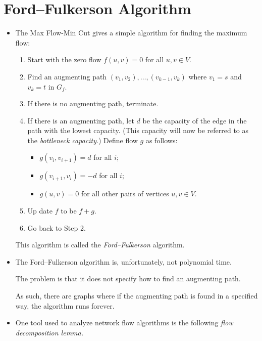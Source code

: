 \documentclass[10pt]{article}
\begin{document}
  \section{Ford--Fulkerson Algorithm} %
  \label{sec:ford-fulkerson}
    \begin{itemize}
      \item The Max Flow-Min Cut gives a simple algorithm for
        finding the maximum flow:
        \begin{enumerate}
          \item Start with the zero flow $f(u,v) = 0$ for all $u, v \in V$.
          \item Find an augmenting path $(v_1, v_2), \dotsc, (v_{k-1}, v_k)$
            where $v_1 = s$ and $v_k = t$ in $G_f$.
          \item If there is no augmenting path, terminate.
          \item If there is an augmenting path, let $d$ be the capacity
             of the edge in the path with the lowest capacity.
             (This capacity will now be referred to as the \emph{bottleneck capacity}.)
             Define flow $g$ as follows:
             \begin{itemize}
              \item $g(v_i, v_{i+1}) = d$ for all $i$;
              \item $g(v_{i+1}, v_i) = -d$ for all $i$;
              \item $g(u,v) = 0$ for all other pairs of vertices $u, v \in V.$
             \end{itemize}
          \item Up date $f$ to be $f + g$.
          \item Go back to Step 2.
        \end{enumerate}
        This algorithm is called the \emph{Ford--Fulkerson} algorithm.
        
      \item The Ford--Fulkerson algorithm is, unfortunately, not polynomial time.
        
        The problem is that it does not specify how to find an augmenting path.
        
        As such, there are graphs where if the augmenting path is found in
        a specified way, the algorithm runs forever.
        
        
        \item One tool used to analyze network flow algorithms is 
          the following \emph{flow decomposition lemma.}


\end{itemize}
\end{document}
